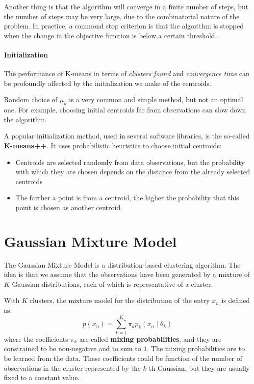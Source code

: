 Another thing is that the algorithm will converge in a finite number of steps, but the number of steps may be very large, due to the combinatorial nature of the problem. In practice, a commond stop criterion is that the algorithm is stopped when the change in the objective function is below a certain threshold.

\paragraph*{Initialization}
The performance of K-means in terms of \textit{clusters found} and \textit{convergence time} can be profoundly affected by the initialization we make of the centroids.

Random choice of $\mu_k$ is a very common and simple method, but not an optimal one. For example, choosing initial centroids far from observations can slow down the algorithm.

A popular initialization method, used in several software libraries, is the so-called \textbf{K-means++}. 
It uses probabilistic heuristics to choose initial centroids:

\begin{itemize}
    \item Centroids are selected randomly from data observations, but the probability with which they are chosen depends on the distance from the already selected centroids
    \item The farther a point is from a centroid, the higher the probability that this point is chosen as another centroid.
\end{itemize}


\section{Gaussian Mixture Model}
The Gaussian Mixture Model is a distribution-based clustering algorithm. The idea is that we assume that the observations have been generated by a mixture of $K$ Gaussian distributions, each of which is representative of a cluster. 

With $K$ clusters, the mixture model for the distribution of the entry $x_n$ is defined as:
\[
    p(x_n) = \sum_{k=1}^{K} \pi_k p_k (x_n \mid \theta_k)
\]
where the coefficients $\pi_k$ are called \textbf{mixing probabilities}, and they are constrained to be non-negative and to sum to $1$. The mixing probabilities are to be learned from the data.
These coefficients could be function of the number of observations in the cluster represented by the $k$-th Gaussian, but they are usually fixed to a constant value.

